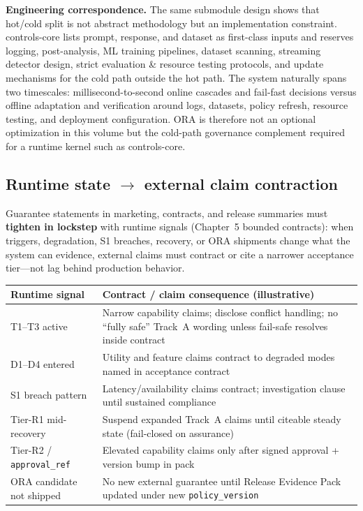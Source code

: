 \documentclass[11pt,a4paper]{report}
\begin{document}

\noindent\textbf{Engineering correspondence.} The same submodule design shows that hot/cold split is not abstract methodology but an implementation constraint. controls-core lists prompt, response, and dataset as first-class inputs and reserves logging, post-analysis, ML training pipelines, dataset scanning, streaming detector design, strict evaluation \& resource testing protocols, and update mechanisms for the cold path outside the hot path. The system naturally spans two timescales: millisecond-to-second online cascades and fail-fast decisions versus offline adaptation and verification around logs, datasets, policy refresh, resource testing, and deployment configuration. ORA is therefore not an optional optimization in this volume but the cold-path governance complement required for a runtime kernel such as controls-core.

\subsection*{Runtime state \(\rightarrow\) external claim contraction}
Guarantee statements in marketing, contracts, and release summaries must \textbf{tighten in lockstep} with runtime signals (Chapter~5 bounded contracts): when triggers, degradation, S1 breaches, recovery, or ORA shipments change what the system can evidence, external claims must contract or cite a narrower acceptance tier---not lag behind production behavior.

\begin{center}
\footnotesize
\begin{tabular}{@{}p{}p{}@{}}
\toprule
\textbf{Runtime signal} & \textbf{Contract / claim consequence (illustrative)} \\
\midrule
T1--T3 active & Narrow capability claims; disclose conflict handling; no ``fully safe'' Track~A wording unless fail-safe resolves inside contract \\
D1--D4 entered & Utility and feature claims contract to degraded modes named in acceptance contract \\
S1 breach pattern & Latency/availability claims contract; investigation clause until sustained compliance \\
Tier-R1 mid-recovery & Suspend expanded Track~A claims until citeable steady state (fail-closed on assurance) \\
Tier-R2 / \texttt{approval\_ref} & Elevated capability claims only after signed approval + version bump in pack \\
ORA candidate not shipped & No new external guarantee until Release Evidence Pack updated under new \texttt{policy\_version} \\
\bottomrule
\end{tabular}
\end{center}
\end{document}

